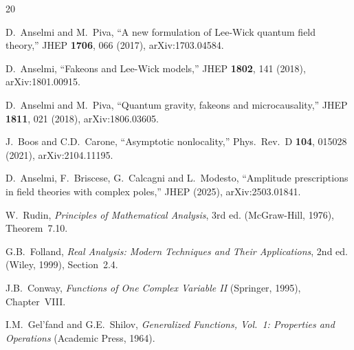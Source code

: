 \documentclass[11pt,a4paper]{article}
\begin{document}
\begin{thebibliography}{20}

D.~Anselmi and M.~Piva,
``A new formulation of Lee-Wick quantum field theory,''
JHEP \textbf{1706}, 066 (2017),
arXiv:1703.04584.

D.~Anselmi,
``Fakeons and Lee-Wick models,''
JHEP \textbf{1802}, 141 (2018),
arXiv:1801.00915.

D.~Anselmi and M.~Piva,
``Quantum gravity, fakeons and microcausality,''
JHEP \textbf{1811}, 021 (2018),
arXiv:1806.03605.

J.~Boos and C.D.~Carone,
``Asymptotic nonlocality,''
Phys.\ Rev.\ D \textbf{104}, 015028 (2021),
arXiv:2104.11195.

D.~Anselmi, F.~Briscese, G.~Calcagni and L.~Modesto,
``Amplitude prescriptions in field theories with complex poles,''
JHEP (2025),
arXiv:2503.01841.

W.~Rudin,
\emph{Principles of Mathematical Analysis}, 3rd ed.
(McGraw-Hill, 1976), Theorem~7.10.

G.B.~Folland,
\emph{Real Analysis: Modern Techniques and Their Applications}, 2nd ed.
(Wiley, 1999), Section~2.4.

J.B.~Conway,
\emph{Functions of One Complex Variable II}
(Springer, 1995), Chapter~VIII.

I.M.~Gel'fand and G.E.~Shilov,
\emph{Generalized Functions, Vol.~1: Properties and Operations}
(Academic Press, 1964).

\end{thebibliography}
\end{document}
